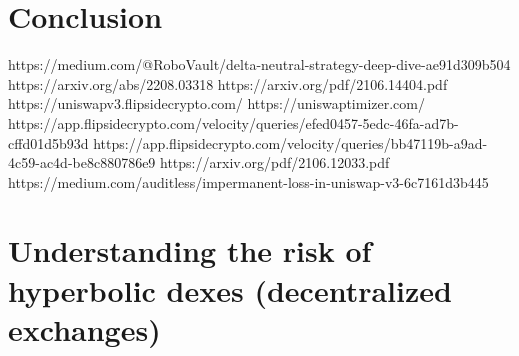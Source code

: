 \documentclass[conference]{IEEEtran}
\begin{document}



\section{Conclusion}
https://medium.com/@RoboVault/delta-neutral-strategy-deep-dive-ae91d309b504
https://arxiv.org/abs/2208.03318
https://arxiv.org/pdf/2106.14404.pdf
https://uniswapv3.flipsidecrypto.com/
https://uniswaptimizer.com/
https://app.flipsidecrypto.com/velocity/queries/efed0457-5edc-46fa-ad7b-cffd01d5b93d
https://app.flipsidecrypto.com/velocity/queries/bb47119b-a9ad-4c59-ac4d-be8c880786e9
https://arxiv.org/pdf/2106.12033.pdf
https://medium.com/auditless/impermanent-loss-in-uniswap-v3-6c7161d3b445 
\appendix
\section{Understanding the risk of hyperbolic dexes (decentralized exchanges)}
\end{document}
